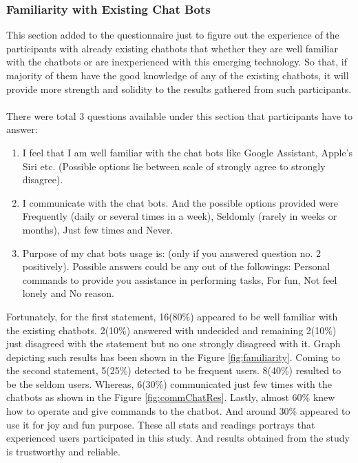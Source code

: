 \subsubsection*{Familiarity with Existing Chat Bots}
This section added to the questionnaire just to figure out the experience of the participants with already existing chatbots that whether they are well familiar with the chatbots or are inexperienced with this emerging technology. So that, if majority of them have the good knowledge of any of the existing chatbots, it will provide more strength and solidity to the results gathered from such participants.
\\~\\
There were total 3 questions available under this section that participants have to answer:
\begin{enumerate}
    \item I feel that I am well familiar with the chat bots like Google Assistant, Apple's Siri etc. (Possible options lie between scale of strongly agree to strongly disagree).
    \item I communicate with the chat bots. And the possible options provided were Frequently (daily or several times in a week), Seldomly (rarely in weeks or months), Just few times and Never.
    \item Purpose of my chat bots usage is: (only if you answered question no. 2 positively). Possible answers could be any out of the followings: Personal commands to provide you assistance in performing tasks, For fun, Not feel lonely and No reason.
\end{enumerate}
Fortunately, for the first statement, 16(80\%) appeared to be well familiar with the existing chatbots. 2(10\%) answered with undecided and remaining 2(10\%) just disagreed with the statement but no one strongly disagreed with it. Graph depicting such results has been shown in the Figure \ref{fig:familiarity}. Coming to the second statement, 5(25\%) detected to be frequent users. 8(40\%) resulted to be the seldom users. Whereas, 6(30\%) communicated just few times with the chatbots as shown in the Figure \ref{fig:commChatRes}. Lastly, almost 60\% knew how to operate and give commands to the chatbot. And around 30\% appeared to use it for joy and fun purpose. These all stats and readings portrays that experienced users participated in this study. And results obtained from the study is trustworthy and reliable. 

